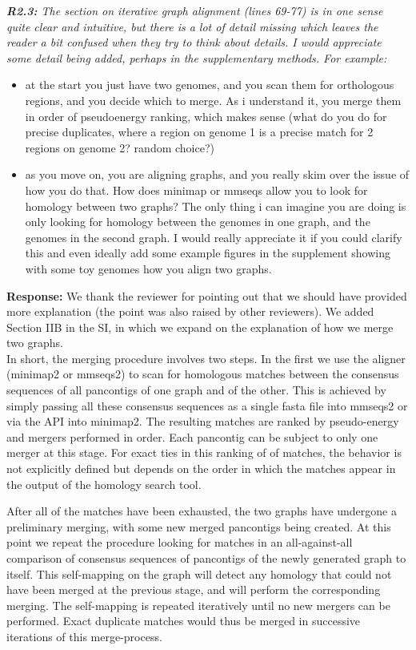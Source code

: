 \documentclass[aps,rmp,onecolumn]{revtex4-1}
\newcommand{\reviewer}[2]{{\it \textbf{#1:} #2\vskip 5mm}}
\newcommand{\response}[1]{{{\color{response}\textbf{Response:} #1}}\vskip 5mm}
\newcommand{\SIalgo}{II}
\begin{document}
\reviewer{R2.3}{The section on iterative graph alignment (lines 69-77) is in one sense quite clear and intuitive, but there is a lot of detail missing which leaves the reader a bit confused when they try to think about details. I would appreciate some detail being added, perhaps in the supplementary methods. For example:
      \begin{itemize}
            \item at the start you just have two genomes, and you scan them for orthologous regions, and you decide which to merge. As i understand it, you merge them in order of pseudoenergy ranking, which makes sense (what do you do for precise duplicates, where a region on genome 1 is a precise match for 2 regions on genome 2? random choice?)
            \item as you move on, you are aligning graphs, and you really skim over the issue of how you do that. How does minimap or mmseqs allow you to look for homology between two graphs? The only thing i can imagine you are doing is only looking for homology between the genomes in one graph, and the genomes in the second graph. I would really appreciate it if you could clarify this and even ideally add some example figures in the supplement showing with some toy genomes how you align two graphs.

      \end{itemize}}
\response{We thank the reviewer for pointing out that we should have provided more explanation (the point was also raised by other reviewers).
We added Section {\SIalgo}B in the SI, in which we expand on the explanation of how we merge two graphs.\\
In short, the merging procedure involves two steps. In the first we use the aligner (minimap2 or mmseqs2) to scan for homologous matches between the consensus sequences of all pancontigs of one graph and of the other.
This is achieved by simply passing all these consensus sequences as a single fasta file into mmseqs2 or via the API into minimap2.
The resulting matches are ranked by pseudo-energy and mergers performed in order.
Each pancontig can be subject to only one merger at this stage.
For exact ties in this ranking of of matches, the behavior is not explicitly defined but depends on the order in which the matches appear in the output of the homology search tool. 

After all of the matches have been exhausted, the two graphs have undergone a preliminary merging, with some new merged pancontigs being created. 
At this point we repeat the procedure looking for matches in an all-against-all comparison of consensus sequences of pancontigs of the newly generated graph to itself. 
This self-mapping on the graph will detect any homology that could not have been merged at the previous stage, and will perform the corresponding merging. 
The self-mapping is repeated iteratively until no new mergers can be performed.
Exact duplicate matches would thus be merged in successive iterations of this merge-process.
}
\end{document}
